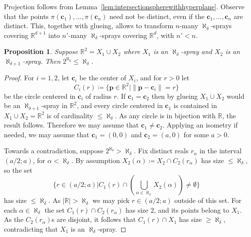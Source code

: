 \documentclass[12pt]{amsart}
\newcommand{\R}{\mathbb{R}}	%
\newcommand{\Mid}{\boldsymbol\mid}			%
\newcommand{\setof}[2]{\mathopen \{{#1}\Mid{#2} \mathclose\}} %
\newcommand{\card}[1]{\mathopen | #1 \mathclose |}		%
\theoremstyle{plain}
\newtheorem{proposition}[theorem]{Proposition}
\theoremstyle{definition}
\theoremstyle{remark}
\begin{document}
Projection follows from Lemma~\ref{lem:intersectionspherewithhyperplane}.
Observe that the points \( \pi ( \mathbf{c}_1 ) , \dots , \pi ( \mathbf{c}_n ) \) need not be distinct, even if the \( \mathbf{c}_1 , \dots , \mathbf{c}_n \) are distinct.
This, together with glueing, allows to transform \( n \)-many \( \aleph_ \delta \)-sprays covering \( \R^{ d + 1 } \) into \( n' \)-many \( \aleph_ \delta \)-sprays covering \( \R^d \), with \( n' < n \).

\begin{proposition}\label{prop:R2notunionof2sprays}
Suppose \( \R^2 = X_1 \cup X_2 \) where \( X_1 \) is an \( \aleph_ \delta \)-spray and \( X_2 \) is an \( \aleph_ { \delta + 1 } \)-spray.
Then \( 2^{\aleph_0} \leq \aleph_ \delta \).
\end{proposition}

\begin{proof}
For \( i = 1 , 2 \), let \( \mathbf{c}_i \) be the center of \( X_i \), and for \( r > 0 \) let
\[
 C_i ( r ) \coloneqq \setof{ \mathbf{p} \in \R^2 }{ \| \mathbf{p} - \mathbf{c}_i \| = r }
\] 
be the circle centered in \( \mathbf{c}_i \) of radius \( r \).
If \( \mathbf{c}_1 = \mathbf{c}_2 \) then by glueing \( X_1 \cup X_2 \) would be an \( \aleph_ { \delta + 1 } \)-spray in \( \R^2 \), and every circle centered in \( \mathbf{c}_1 \) is contained in \( X_1 \cup X_2 = \R^2 \) is of cardinality \( \leq \aleph_ \delta \).
As any circle is in bijection with \( \R \), the result follows.
Therefore we may assume that \( \mathbf{c}_1 \neq \mathbf{c}_2 \).
Applying an isometry if needed, we may assume that \( \mathbf{c}_1 = ( 0 , 0 ) \) and \( \mathbf{c}_2 = ( a , 0 ) \) for some \( a > 0 \). 

Towards a contradiction, suppose \( 2^{\aleph_0} > \aleph_ \delta \).
Fix distinct reals \( r_ \alpha \) in the interval \( ( a / 2 ; a ) \), for \( \alpha < \aleph_ \delta \).
By assumption \( X_ 2 ( \alpha ) \coloneqq X_2 \cap C_2 ( r_ \alpha ) \) has size \( \leq \aleph_ \delta \), so the set
\[
\textstyle \setof{ r \in ( a / 2 ; a ) }{ C_1 ( r ) \cap ( \bigcup_{ \alpha \in \aleph_ \delta } X_2 ( \alpha ) ) \neq \emptyset }
\]
has size \( \leq \aleph_ \delta \).
As \( \card{\R} > \aleph_ \delta \) we may pick \( r \in ( a / 2 ; a ) \) outside of this set.
For each \( \alpha \in \aleph_ \delta \) the set \( C_1 ( r ) \cap C_2 ( r_ \alpha ) \) has size \( 2 \), and its points belong to \( X_1 \).
As the \( C_2 ( r_ \alpha ) \)s are disjoint, it follows that \( C_1 ( r ) \cap X_1 \) has size \( \geq \aleph_ \delta \), contradicting that \( X_1 \) is an \( \aleph_ \delta \)-spray.
\end{proof}
\end{document}
